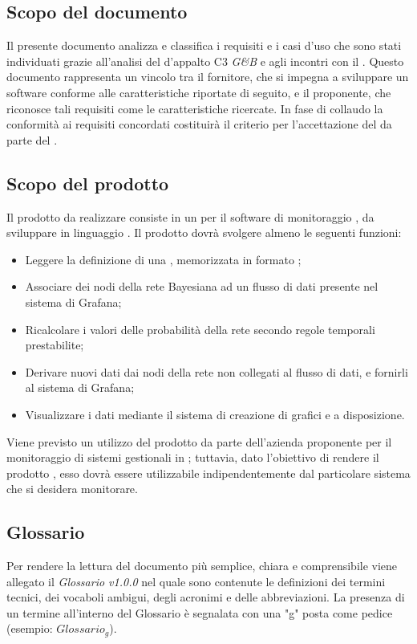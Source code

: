 \subsection{Scopo del documento}
Il presente documento analizza e classifica i requisiti e i casi d'uso che sono stati individuati grazie all'analisi del  d'appalto C3 \emph{G\&B} e agli incontri con il .
Questo documento rappresenta un vincolo tra il fornitore, che si impegna a sviluppare un
software conforme alle caratteristiche riportate di seguito, e il proponente, che riconosce tali
requisiti come le caratteristiche ricercate.
In fase di collaudo la conformità ai requisiti concordati costituirà il criterio per l'accettazione
del  da parte del .
\subsection{Scopo del prodotto}
Il prodotto da realizzare consiste in un  per il software di monitoraggio , da sviluppare in linguaggio . Il prodotto dovrà svolgere almeno le seguenti funzioni:
\begin{itemize}
	\item{Leggere la definizione di una , memorizzata in formato ;}
	\item{Associare dei nodi della rete Bayesiana ad un flusso di dati presente nel sistema di Grafana;}
	\item{Ricalcolare i valori delle probabilità della rete secondo regole temporali prestabilite;}
	\item{Derivare nuovi dati dai nodi della rete non collegati al flusso di dati, e fornirli al sistema di Grafana;}
	\item{Visualizzare i dati mediante il sistema di creazione di grafici e  a disposizione.}
\end{itemize}
Viene previsto un utilizzo del prodotto da parte dell'azienda proponente per il monitoraggio di sistemi gestionali in ; tuttavia, dato l'obiettivo di rendere il prodotto , esso dovrà essere utilizzabile indipendentemente dal particolare sistema che si desidera monitorare.
\subsection{Glossario}
Per rendere la lettura del documento più semplice, chiara e comprensibile viene allegato il \emph{Glossario v1.0.0} nel quale sono contenute le definizioni dei termini tecnici, dei vocaboli ambigui, degli acronimi e delle abbreviazioni. La presenza di un termine all'interno del Glossario è segnalata con una "g" posta come pedice (esempio: $Glossario_{g}$). 
